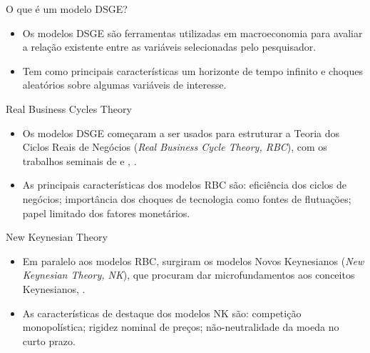 \documentclass[
presentation.tex
]{subfiles}
\begin{document}

\begin{frame}{O que é um modelo DSGE?}
	
	\begin{itemize}
		\item Os modelos DSGE são ferramentas utilizadas em macroeconomia para avaliar a relação existente entre as variáveis selecionadas pelo pesquisador.
		\item Tem como principais características um horizonte de tempo infinito e choques aleatórios sobre algumas variáveis de interesse.
	\end{itemize}
	
\end{frame}


\begin{frame}{Real Business Cycles Theory}
	
	\begin{itemize}
		\item Os modelos DSGE começaram a ser usados para estruturar a Teoria dos Ciclos Reais de Negócios (\textit{Real Business Cycle Theory, RBC}), com os trabalhos seminais de \textcite{kydland_time_1982} e \textcite{prescott_theory_1986}, \textcite{gali_monetary_2015}.
		\item As principais características dos modelos RBC são: eficiência dos ciclos de negócios; importância dos choques de tecnologia como fontes de flutuações; papel limitado dos fatores monetários.
	\end{itemize}
	
\end{frame}


\begin{frame}{New Keynesian Theory}
	
	\begin{itemize}
		\item Em paralelo aos modelos RBC, surgiram os modelos Novos Keynesianos (\textit{New Keynesian Theory, NK}), que procuram dar microfundamentos aos conceitos Keynesianos, \textcite[p.26]{gali_macroeconomic_2007}.
		\item As características de destaque dos modelos NK são: competição monopolística; rigidez nominal de preços; não-neutralidade da moeda no curto prazo.
	\end{itemize}
	
\end{frame}
\end{document}
